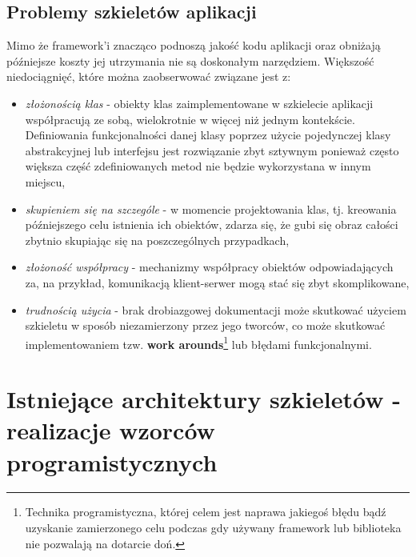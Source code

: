 	\subsection{Problemy szkieletów aplikacji}
	Mimo że framework'i znacząco podnoszą jakość kodu aplikacji oraz obniżają późniejsze koszty jej utrzymania nie są doskonałym
	narzędziem. Większość niedociągnięć, które można zaobserwować związane jest z:
	\begin{itemize}
		\item \textit{złożonością klas} - obiekty klas zaimplementowane w szkielecie aplikacji współpracują ze sobą, wielokrotnie w
		więcej niż jednym kontekście. Definiowania funkcjonalności danej klasy poprzez użycie pojedynczej klasy abstrakcyjnej lub
		interfejsu jest rozwiązanie zbyt sztywnym ponieważ często większa część zdefiniowanych metod nie będzie wykorzystana 
		w innym miejscu,
		\item \textit{skupieniem się na szczególe} - w momencie projektowania klas, tj. kreowania późniejszego celu istnienia 
		ich obiektów, zdarza się, że gubi się obraz całości zbytnio skupiając się na poszczególnych przypadkach, 
		\item \textit{złożoność współpracy} - mechanizmy współpracy obiektów odpowiadających za, na przykład, komunikacją klient-serwer
		mogą stać się zbyt skomplikowane,
		\item \textit{trudnością użycia} - brak drobiazgowej dokumentacji może skutkować użyciem szkieletu w sposób niezamierzony przez
		jego tworców, co może skutkować implementowaniem tzw. \textbf{work arounds}\footnote{Technika programistyczna, której celem jest
		naprawa jakiegoś błędu bądź uzyskanie zamierzonego celu podczas gdy używany framework lub biblioteka nie pozwalają na dotarcie
		doń.} lub błędami funkcjonalnymi\cite{framework_design_-_a_role_modeling_approach}. 
	\end{itemize}
	
\section{Istniejące architektury szkieletów - realizacje wzorców programistycznych}
	
